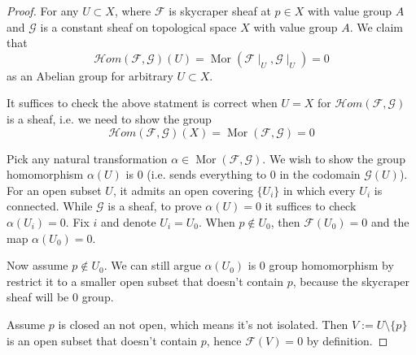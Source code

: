 \begin{proof}
	For any $U\subset X$, where $\mathscr F$ is skycraper sheaf at $p\in X$ with value group $A$ and $\mathscr G$ is a constant sheaf on topological space $X$ with value group $A$. We claim that 
	\[\mathcal Hom (\mathscr F,\mathscr G)(U)=\operatorname{Mor}(\mathscr F\mid_U,\mathscr G\mid_U)=0\] as an Abelian group for arbitrary $U\subset X$. 
	
	It suffices to check the above statment is correct when $U=X$ for $\mathcal Hom(\mathscr F,\mathscr G)$ is a sheaf, i.e. we need to show the group
	\[\mathcal Hom(\mathscr F,\mathscr G)(X)=\operatorname{Mor}(\mathscr F,\mathscr G)=0\] 
	
	Pick any natural transformation $\alpha\in\operatorname{Mor}(\mathscr F,\mathscr G)$. We wish to show the group homomorphism $\alpha(U)$ is $0$ (i.e. sends everything to $0$ in the codomain $\mathscr G(U)$). For an open subset $U$, it admits an open covering $\{U_i\}$ in which every $U_i$ is connected. While $\mathscr G$ is a sheaf, to prove $\alpha(U)=0$ it suffices to check $\alpha(U_i)=0$. Fix $i$ and denote $U_i=U_0$. When $p\notin U_0$, then $\mathscr F(U_0)=0$ and the map $\alpha(U_0)=0$.

	Now assume $p\notin U_0$. We can still argue $\alpha(U_0)$ is $0$ group homomorphism by restrict it to a smaller open subset that doesn't contain $p$, because the skycraper sheaf will be $0$ group. 

	Assume $p$ is closed an not open, which means it's not isolated. Then $V:=U\setminus \{p\}$ is an open subset that doesn't contain $p$, hence $\mathscr F(V)=0$ by definition. 


\end{proof}
